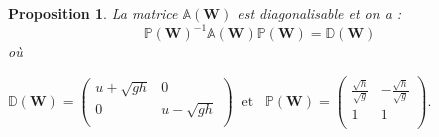 \documentclass[
11pt, %
francais, %
singlespacing, %
headsepline, %
]{MastersDoctoralThesis} %
\newtheorem{prop}{Proposition}
\theoremstyle{definition}
\begin{document}
\begin{prop}
La matrice $\mathbb{A}(\textbf{W})$ est diagonalisable et on a :
$$
\mathbb{P}(\textbf{W})^{-1}\mathbb{A}(\textbf{W})\mathbb{P}(\textbf{W})=\mathbb{D}(\textbf{W})
$$
où 

\begin{center}

$\mathbb{D}(\textbf{W}) =\begin{pmatrix}
   u+\sqrt{gh} & 0  \\
   0 & u-\sqrt{gh}  \\
\end{pmatrix} \phantom{..} \text{et}\phantom{...} \mathbb{P}(\textbf{W}) =\begin{pmatrix}
   \frac{\sqrt{h}}{\sqrt{g}} & -\frac{\sqrt{h}}{\sqrt{g}} \\
   1 & 1  \\
\end{pmatrix}.
$
\end{center}

\end{prop}
\end{document}
